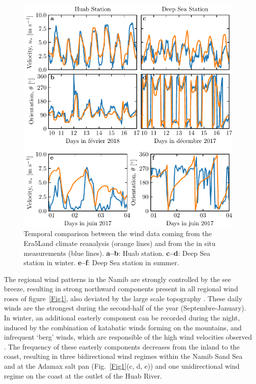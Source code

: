   \begin{figure}
    \centering
    \includegraphics[scale=1]{Figures/Figure2.pdf}
    \caption{Temporal comparison between the wind data coming from the Era5Land climate reanalysis (orange lines) and from the in situ measurements (blue lines). \textbf{a--b}: Huab station. \textbf{c--d}: Deep Sea station in winter. \textbf{e--f}: Deep Sea station in summer.}
    \label{Fig2}
  \end{figure}

  The regional wind patterns in the Namib are strongly controlled by the see breeze, resulting in strong northward components present in all regional wind roses of figure~\ref{Fig1}, also deviated by the large scale topography \citep{lancaster1985}. These daily winds are the strongest during the second-half of the year (Septembre-January). In winter, an additional easterly component can be recorded during the night, induced by the combination of katabatic winds forming on the mountains, and infrequent `berg' winds, which are responsible of the high wind velocities observed \citep{lancaster1984}. The frequency of these easterly components decreases from the inland to the coast, resulting in three bidirectional wind regimes within the Namib Sand Sea and at the Adamax salt pan (Fig.~\ref{Fig1}(c, d, e)) and one unidirectional wind regime on the coast at the outlet of the Huab River.

